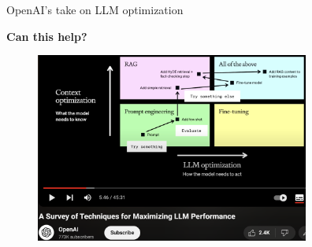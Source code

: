\begin{vbframe}{OpenAI's take on LLM optimization}

\vfill

\textbf{Can this help?}

\textbf{\href{https://www.youtube.com/watch?v=ahnGLM-RC1Y}{}}


\vfill

\begin{figure}
\centering
\includegraphics[width = 9cm]{figure/openai,llm,optimization.png}
\end{figure}

\end{vbframe}


\endlecture


